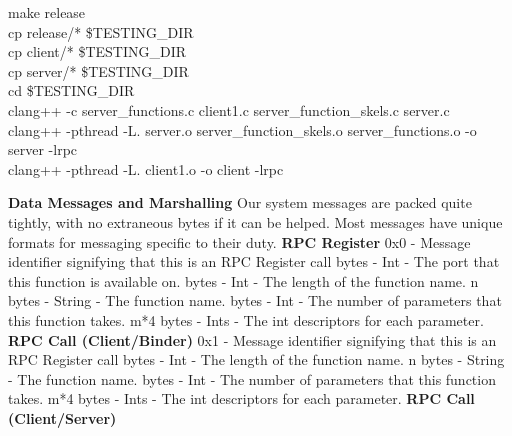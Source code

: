 \documentclass[]{article}
\begin{document}
\begin{center}
make release\\
cp release/* \$TESTING\_DIR\\
cp client/* \$TESTING\_DIR\\
cp server/* \$TESTING\_DIR\\
cd \$TESTING\_DIR\\
clang++ -c server\_functions.c client1.c server\_function\_skels.c server.c\\
clang++ -pthread -L. server.o server\_function\_skels.o server\_functions.o -o server -lrpc\\
clang++ -pthread -L. client1.o -o client -lrpc
\end{center}

\noindent
\newline
{\bf Data Messages and Marshalling}\newline
Our system messages are packed quite tightly, with no extraneous bytes if it can be helped. Most messages have unique formats for messaging specific to their duty.
\newline\newline
{\bf RPC Register}\newline
0x0 - Message identifier signifying that this is an RPC Register call bytes - Int - The port that this function is available on. bytes - Int - The length of the function name.\newline
n bytes - String - The function name. bytes - Int - The number of parameters that this function takes.\newline
m*4 bytes - Ints - The int descriptors for each parameter.\newline\newline
{\bf RPC Call (Client/Binder)}\newline
0x1 - Message identifier signifying that this is an RPC Register call bytes - Int - The length of the function name.\newline
n bytes - String - The function name. bytes - Int - The number of parameters that this function takes.\newline
m*4 bytes - Ints - The int descriptors for each parameter.\newline\newline
{\bf RPC Call (Client/Server)}\newline
\end{document}
